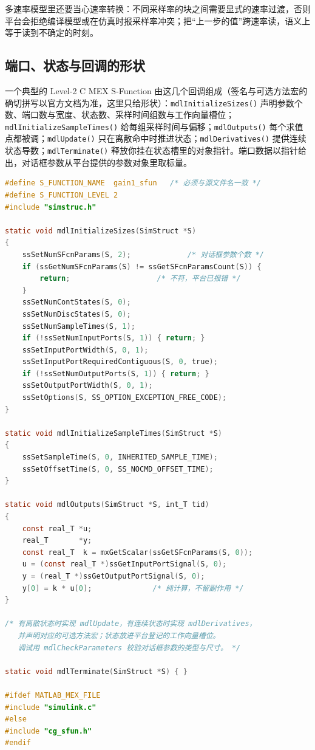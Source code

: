 \documentclass[12pt,a4paper,fontset=fandol]{ctexbook}
\newcommand{\Fn}[1]{\texttt{#1()}}
\newcommand{\Lang}[1]{\textsf{#1}}
\newcommand{\CL}{\Lang{C}}
\begin{document}
多速率模型里还要当心速率转换：不同采样率的块之间需要显式的速率过渡，否则平台会拒绝编译模型或在仿真时报采样率冲突；把``上一步的值''跨速率读，语义上等于读到不确定的时刻。

\subsection*{端口、状态与回调的形状}

一个典型的 Level-2 \CL{} MEX S-Function 由这几个回调组成（签名与可选方法宏的确切拼写以官方文档为准，这里只给形状）：\Fn{mdlInitializeSizes} 声明参数个数、端口数与宽度、状态数、采样时间组数与工作向量槽位；\Fn{mdlInitializeSampleTimes} 给每组采样时间与偏移；\Fn{mdlOutputs} 每个求值点都被调；\Fn{mdlUpdate} 只在离散命中时推进状态；\Fn{mdlDerivatives} 提供连续状态导数；\Fn{mdlTerminate} 释放你挂在状态槽里的对象指针。端口数据以指针给出，对话框参数从平台提供的参数对象里取标量。

\begin{lstlisting}[language=C, style=cstyle,
  caption={Level-2 C MEX S-Function 最小骨架：只列回调与调用形状},
  label={lst:ch07-sfun-min}]
#define S_FUNCTION_NAME  gain1_sfun   /* 必须与源文件名一致 */
#define S_FUNCTION_LEVEL 2
#include "simstruc.h"

static void mdlInitializeSizes(SimStruct *S)
{
    ssSetNumSFcnParams(S, 2);             /* 对话框参数个数 */
    if (ssGetNumSFcnParams(S) != ssGetSFcnParamsCount(S)) {
        return;                    /* 不符，平台已报错 */
    }
    ssSetNumContStates(S, 0);
    ssSetNumDiscStates(S, 0);
    ssSetNumSampleTimes(S, 1);
    if (!ssSetNumInputPorts(S, 1)) { return; }
    ssSetInputPortWidth(S, 0, 1);
    ssSetInputPortRequiredContiguous(S, 0, true);
    if (!ssSetNumOutputPorts(S, 1)) { return; }
    ssSetOutputPortWidth(S, 0, 1);
    ssSetOptions(S, SS_OPTION_EXCEPTION_FREE_CODE);
}

static void mdlInitializeSampleTimes(SimStruct *S)
{
    ssSetSampleTime(S, 0, INHERITED_SAMPLE_TIME);
    ssSetOffsetTime(S, 0, SS_NOCMD_OFFSET_TIME);
}

static void mdlOutputs(SimStruct *S, int_T tid)
{
    const real_T *u;
    real_T       *y;
    const real_T  k = mxGetScalar(ssGetSFcnParams(S, 0));
    u = (const real_T *)ssGetInputPortSignal(S, 0);
    y = (real_T *)ssGetOutputPortSignal(S, 0);
    y[0] = k * u[0];              /* 纯计算，不留副作用 */
}

/* 有离散状态时实现 mdlUpdate，有连续状态时实现 mdlDerivatives，
   并声明对应的可选方法宏；状态放进平台登记的工作向量槽位。
   调试用 mdlCheckParameters 校验对话框参数的类型与尺寸。 */

static void mdlTerminate(SimStruct *S) { }

#ifdef MATLAB_MEX_FILE
#include "simulink.c"
#else
#include "cg_sfun.h"
#endif
\end{lstlisting}
\end{document}
